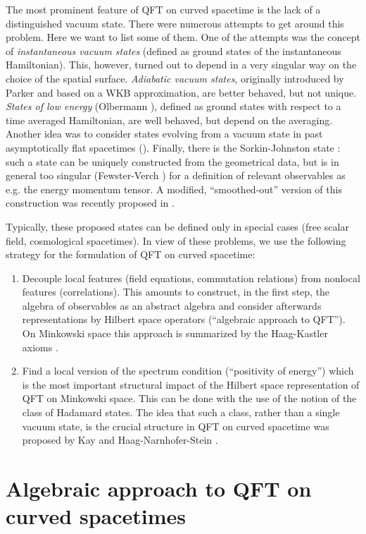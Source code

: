 \documentclass[11pt]{article}
\newcommand{\1}{\mathds{1}}                         %
\begin{document}
The most prominent feature of QFT on curved spacetime is the lack of a distinguished vacuum state. There were numerous attempts to get around this problem. Here we want to list some of them. One of the attempts was the concept of \textit{instantaneous vacuum states} (defined as ground states of the instantaneous Hamiltonian). This, however, turned out to depend in a very singular way on the choice of the spatial surface. \textit{Adiabatic vacuum states}, originally introduced by  Parker \cite{Parker} and based on a WKB approximation, are  better behaved, but not unique. \textit{States of low energy} (Olbermann \cite{Olbermann}), defined as ground states with respect to a time averaged Hamiltonian, are  well behaved, but depend on the averaging. Another idea was to consider states evolving from a vacuum state in past asymptotically flat spacetimes (\cite{DMP09a,DMP09,DMP11,DHP11,DS11,BDM14}). Finally, there is the Sorkin-Johnston state \cite{Johnston,Sorkin,SJ12}: such a state can be uniquely constructed from the geometrical data, but is  in general too singular (Fewster-Verch \cite{FV12}) for a definition of relevant observables as e.g. the energy momentum tensor. A modified, ``smoothed-out'' version of this construction was recently proposed in \cite{BrumF14}.

Typically, these proposed states can be defined only in special cases (free scalar field, cosmological spacetimes). In view of these problems, we use the following strategy for the formulation of QFT on curved spacetime:
\begin{enumerate}
\item Decouple local features (field equations, commutation relations) from nonlocal features (correlations). This amounts to construct, in the first step, the algebra of observables as an abstract algebra and consider afterwards representations by Hilbert space operators (``algebraic approach to QFT''). On Minkowski space this approach is summarized by the Haag-Kastler axioms \cite{HK,Haag}.
\item Find a local version of the spectrum condition (``positivity of energy'') which is the most important structural impact of the Hilbert space representation of QFT on Minkowski space. This can be done with the use of the notion of the class of Hadamard states. The idea that such a class, rather than a single vacuum state, is the crucial structure in QFT on curved spacetime was proposed by Kay \cite{Kay84} and Haag-Narnhofer-Stein  \cite{HNS}.
\end{enumerate}
\section{Algebraic approach to QFT on curved spacetimes}
\end{document}
